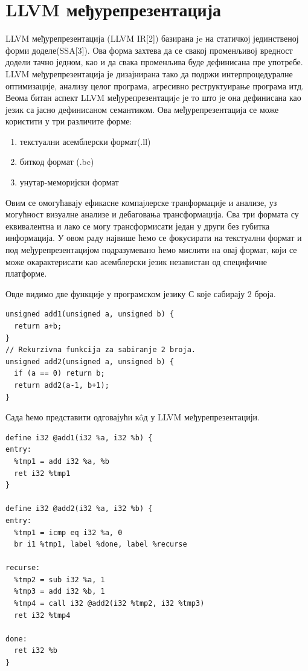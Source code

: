 \documentclass[12pt,oneside]{memoir}
\begin{document}
\section{LLVM међурепрезентација}
LLVM међурепрезентација (LLVM IR[2]) базирана je на статичкој 
јединственој форми доделе(SSA[3]).
Ова форма захтева да се свакој променљивој вредност додели тачно једном, као и да
свака променљива буде дефинисана пре употребе.
LLVM међурепрезентација је дизајнирана тако да подржи интерпроцедуралне оптимизације,
анализу целог програма, агресивно реструктуирање програма итд.
Веома битан аспект LLVM међурепрезентацијe је то што је она дефинисана као 
језик са јасно дефинисаном семантиком.
Ова међурепрезентација се може користити у три различите форме: 
\begin{enumerate}
\item текстуални асемблерски формат(.ll)
\item биткод  формат (.bc)
\item унутар-меморијски формат 
\end{enumerate} 
Овим се омогућавају ефикасне компајлерске транформације и анализе, уз могућност
визуалне анализе и дебаговања трансформација. 
Сва три формата су еквивалентна и лако се могу трансформисати један у други без
губитка информација. 
У овом раду највише ћемо се фокусирати на текстуални формат и под међурепрезентацијом
подразумевано ћемо мислити на овај формат, који се може окарактерисати као асемблерски 
језик независтан од специфичне платформе.

Овде видимо две функције у програмском језику С које сабирају 2 броја.
\begin{lstlisting}
unsigned add1(unsigned a, unsigned b) {
  return a+b;
}
// Rekurzivna funkcija za sabiranje 2 broja.
unsigned add2(unsigned a, unsigned b) {
  if (a == 0) return b;
  return add2(a-1, b+1);
}
\end{lstlisting}

Сада ћемо представити одговајући к\^{o}д у LLVM међурепрезентацији.
\begin{lstlisting}
define i32 @add1(i32 %a, i32 %b) {
entry:
  %tmp1 = add i32 %a, %b
  ret i32 %tmp1
}

define i32 @add2(i32 %a, i32 %b) {
entry:
  %tmp1 = icmp eq i32 %a, 0
  br i1 %tmp1, label %done, label %recurse

recurse:
  %tmp2 = sub i32 %a, 1
  %tmp3 = add i32 %b, 1
  %tmp4 = call i32 @add2(i32 %tmp2, i32 %tmp3)
  ret i32 %tmp4

done:
  ret i32 %b
}
\end{lstlisting}
\end{document}
